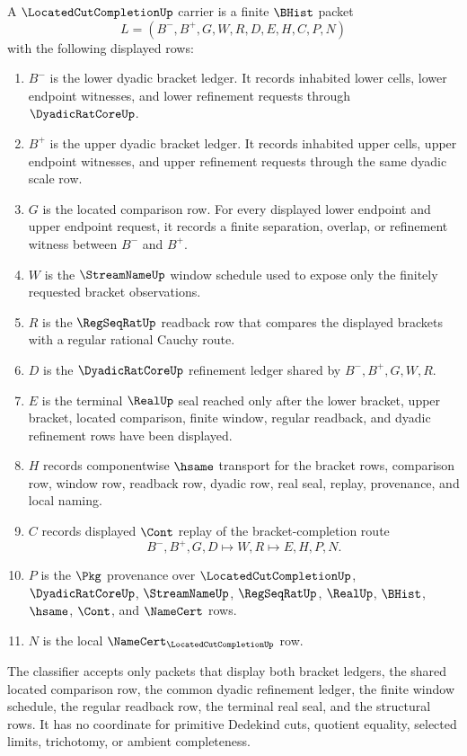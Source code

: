 \begin{definition}\label{def:located-cut-completion-bracket-carrier}
A $\LocatedCutCompletionUp$ carrier is a finite $\BHist$ packet
$$
L=(B^{-},B^{+},G,W,R,D,E,H,C,P,N)
$$
with the following displayed rows:
\begin{enumerate}
\item $B^{-}$ is the lower dyadic bracket ledger. It records inhabited lower cells, lower endpoint witnesses, and lower refinement requests through $\DyadicRatCoreUp$.
\item $B^{+}$ is the upper dyadic bracket ledger. It records inhabited upper cells, upper endpoint witnesses, and upper refinement requests through the same dyadic scale row.
\item $G$ is the located comparison row. For every displayed lower endpoint and upper endpoint request, it records a finite separation, overlap, or refinement witness between $B^{-}$ and $B^{+}$.
\item $W$ is the $\StreamNameUp$ window schedule used to expose only the finitely requested bracket observations.
\item $R$ is the $\RegSeqRatUp$ readback row that compares the displayed brackets with a regular rational Cauchy route.
\item $D$ is the $\DyadicRatCoreUp$ refinement ledger shared by $B^{-},B^{+},G,W,R$.
\item $E$ is the terminal $\RealUp$ seal reached only after the lower bracket, upper bracket, located comparison, finite window, regular readback, and dyadic refinement rows have been displayed.
\item $H$ records componentwise $\hsame$ transport for the bracket rows, comparison row, window row, readback row, dyadic row, real seal, replay, provenance, and local naming.
\item $C$ records displayed $\Cont$ replay of the bracket-completion route
$$
B^{-},B^{+},G,D \longmapsto W,R \longmapsto E,H,P,N .
$$
\item $P$ is the $\Pkg$ provenance over $\LocatedCutCompletionUp$, $\DyadicRatCoreUp$, $\StreamNameUp$, $\RegSeqRatUp$, $\RealUp$, $\BHist$, $\hsame$, $\Cont$, and $\NameCert$ rows.
\item $N$ is the local $\NameCert_{\LocatedCutCompletionUp}$ row.
\end{enumerate}
The classifier accepts only packets that display both bracket ledgers, the shared located comparison row, the common dyadic refinement ledger, the finite window schedule, the regular readback row, the terminal real seal, and the structural rows. It has no coordinate for primitive Dedekind cuts, quotient equality, selected limits, trichotomy, or ambient completeness.
\end{definition}

